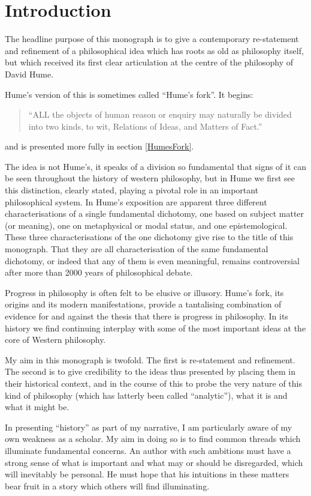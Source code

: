 \section{Introduction}\label{Introduction}

The headline purpose of this monograph is to give a contemporary re-statement and refinement of a philosophical idea which has roots as old as philosophy itself, but which received its first clear articulation at the centre of the philosophy of David Hume.

Hume's version of this is sometimes called ``Hume's fork''.
It begins:

\begin{quote}
``ALL the objects of human reason or enquiry may naturally be divided into two kinds, to wit, Relations of Ideas, and Matters of Fact.''
\end{quote}

and is presented more fully in section \ref{HumesFork}.

The idea is not Hume's, it speaks of a division so fundamental that signs of it can be seen throughout the history of western philosophy, but in Hume we first see this distinction, clearly stated, playing a pivotal role in an important philosophical system.
In Hume's exposition are apparent three different characterisations of a single fundamental dichotomy, one based on subject matter (or meaning), one on metaphysical or modal status, and one epistemological.
These three characterisations of the one dichotomy give rise to the title of this monograph.
That they are all characterisation of the same fundamental dichotomy, or indeed that any of them is even meaningful, remains controversial after more than 2000 years of philosophical debate. 


Progress in philosophy is often felt to be elusive or illusory.
Hume's fork, its origins and its modern manifestations, provide a tantalising combination of evidence for and against the thesis that there is progress in philosophy.
In its history we find continuing interplay with some of the most important ideas at the core of Western philosophy.

My aim in this monograph is twofold.
The first is re-statement and refinement.
The second is to give credibility to the ideas thus presented by placing them in their historical context, and in the course of this to probe the very nature of this kind of philosophy (which has latterly been called ``analytic''), what it is and what it might be.

In presenting ``history'' as part of my narrative, I am particularly aware of my own weakness as a scholar.
My aim in doing so is to find common threads which illuminate fundamental concerns.
An author with such ambitions must have a strong sense of what is important and what may or should be disregarded, which will inevitably be personal.
He must hope that his intuitions in these matters bear fruit in a story which others will find illuminating.
